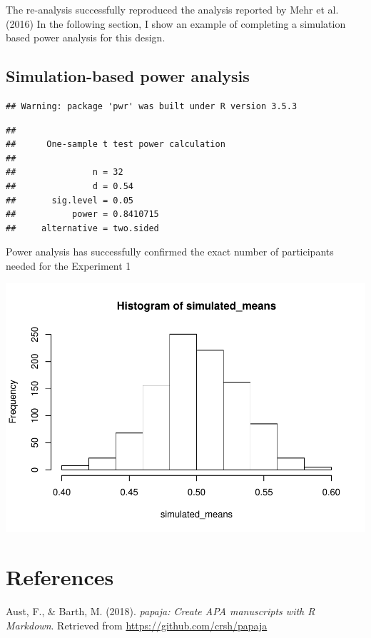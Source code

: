 \documentclass[man]{apa6}
\begin{document}
The re-analysis successfully reproduced the analysis reported by Mehr et
al. (2016) In the following section, I show an example of completing a
simulation based power analysis for this design.

\subsection{Simulation-based power
analysis}\label{simulation-based-power-analysis}

\begin{verbatim}
## Warning: package 'pwr' was built under R version 3.5.3
\end{verbatim}

\begin{verbatim}
## 
##      One-sample t test power calculation 
## 
##               n = 32
##               d = 0.54
##       sig.level = 0.05
##           power = 0.8410715
##     alternative = two.sided
\end{verbatim}

Power analysis has successfully confirmed the exact number of
participants needed for the Experiment 1

\includegraphics{Midterm_files/figure-latex/unnamed-chunk-9-1.pdf}
\newpage

\section{References}\label{references}

\begingroup
\setlength{\parindent}{-0.5in} \setlength{\leftskip}{0.5in}

\hypertarget{refs}{}
\hypertarget{ref-R-papaja}{}
Aust, F., \& Barth, M. (2018). \emph{papaja: Create APA manuscripts with
R Markdown}. Retrieved from \url{https://github.com/crsh/papaja}
\end{document}
